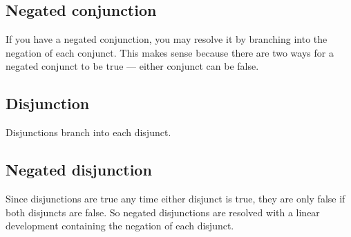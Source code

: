 
\subsection{Negated conjunction}

If you have a negated conjunction, you may resolve it by branching into the negation of each conjunct. This makes sense because there are two ways for a negated conjunct to be true --- either conjunct can be false.


\subsection{Disjunction}
\label{subsec.DisjunctionTreeRule}
\begin{groupitems}
Disjunctions branch into each disjunct.

\end{groupitems}

\subsection{Negated disjunction}

Since disjunctions are true any time either disjunct is true, they are only false if both disjuncts are false. So negated disjunctions are resolved with a linear development containing the negation of each disjunct.


